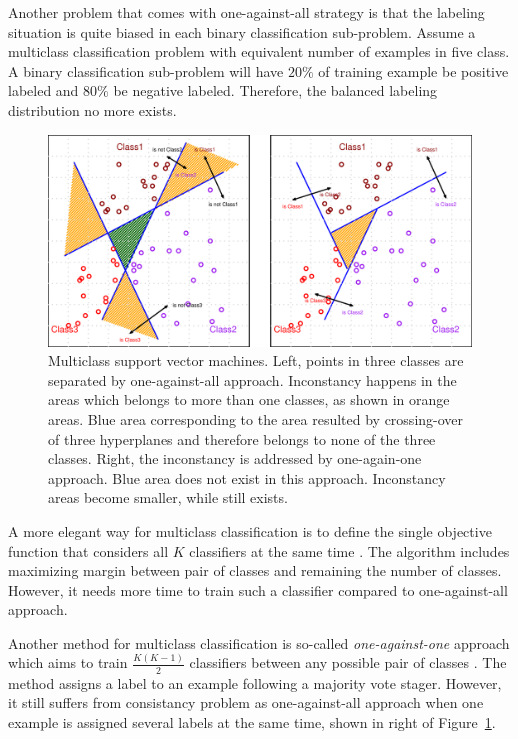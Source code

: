 \documentclass[english]{tktltiki}
\begin{document}

Another problem that comes with one-against-all strategy is that the labeling situation is quite biased in each binary classification sub-problem. Assume a multiclass classification problem with equivalent number of examples in five class. A binary classification sub-problem will have $20\%$ of training example be positive labeled and $80\%$ be negative labeled. Therefore, the balanced labeling distribution no more exists.

\begin{figure}[t]
\begin{center}
\centering
\includegraphics[width=.9\columnwidth]{./plots/multiclass_svm.pdf}
\caption[Multiclass support vector machines.]{Multiclass support vector machines. Left, points in three classes are separated by one-against-all approach. Inconstancy happens in the areas which belongs to more than one classes, as shown in orange areas. Blue area corresponding to the area resulted by crossing-over of three hyperplanes and therefore belongs to none of the three classes. Right, the inconstancy is addressed by one-again-one approach. Blue area does not exist in this approach. Inconstancy areas become smaller, while still exists.}
\label{multiclass_svm}
\end{center}
\end{figure}


A more elegant way for multiclass classification is to define the single objective function that considers all $K$ classifiers at the same time \cite{weston99}. The algorithm includes maximizing margin between pair of classes and remaining the number of classes. However, it needs more time to train such a classifier compared to one-against-all approach. 

Another method for multiclass classification is so-called {\em one-against-one} approach which aims to train $\frac{K(K-1)}{2}$ classifiers between any possible pair of classes \cite{kressel99}. The method assigns a label to an example following a majority vote stager. However, it still suffers from consistancy problem as one-against-all approach when one example is assigned several labels at the same time, shown in right of Figure~\ref{multiclass_svm}. 
\end{document}
